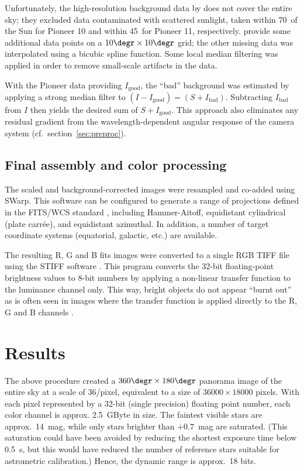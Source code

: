 \documentclass[preprint]{aastex}
\begin{document}
Unfortunately, the high-resolution background data by \cite{Gor1998} does not cover the entire sky; they excluded  data contaminated with scattered sunlight, taken within 70\degr\ of the Sun for Pioneer 10 and within 45\degr\ for Pioneer 11, respectively. \citet{Lei1998} provide some additional data points on a $10\degr\times 10\degr$ grid; the other missing data was interpolated using a bicubic spline function.
Some local median filtering was applied in order to remove small-scale artifacts in the data.

With the Pioneer data providing $I_\text{good}$, the ``bad'' background was estimated by applying a strong median filter to $(I-I_\text{good}) = (S + I_\text{bad})$. Subtracting $I_\text{bad}$ from $I$ then yields the desired sum of $S+I_\text{good}$. This approach also eliminates any residual gradient from the wavelength-dependent angular response of the camera system (cf.\ section~\ref{sec:preproc}).


% 
% 

\subsection{Final assembly and color processing}
The scaled and background-corrected images were resampled and co-added using SWarp. This software can be configured to generate a range of projections defined in the FITS/WCS standard \citep{Cal2002}, including Hammer-Aitoff, equidistant cylindrical (plate carr\'ee), and equidistant azimuthal. In addition, a number of target coordinate systems (equatorial, galactic, etc.) are available.

The resulting R, G and B fits images were converted to a single RGB TIFF file using the STIFF software \citep{Ber2008}. This program converts the 32-bit floating-point brightness values to 8-bit numbers by applying a non-linear transfer function to the luminance channel only. This way, bright objects do not appear ``burnt out'' as is often seen in images where the transfer function is applied directly to the R, G and B channels \citep{Lup2004}.


\section{Results}
The above procedure created a $360\degr\times 180\degr$ panorama image of the entire sky at a scale of 36\arcsec/pixel, equivalent to a size of $36000\times 18000$ pixels. With each pixel represented by a 32-bit (single precision) floating point number, each color channel is approx. 2.5~GByte in size.
The faintest visible stars are approx.\ 14~mag, while only stars brighter than $+0.7$~mag are saturated. (This saturation could have been avoided by reducing the shortest exposure time below 0.5~s, but this would have reduced the number of reference stars suitable for astrometric calibration.) Hence, the dynamic range is approx.\ 18 bits.
\end{document}
